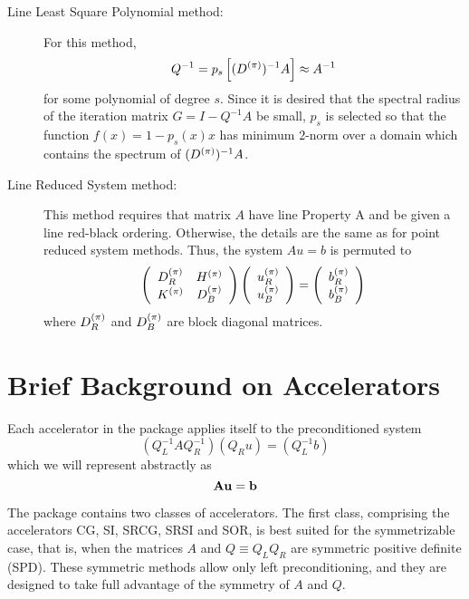 \begin{description}
\item[Line Least Square Polynomial method:]
      For this method,
      \[ Q^{-1} = p_s \left[(D^{(\pi)})^{-1}A \right] \approx A^{-1} \]
      for some polynomial of degree $s$.  Since it is desired that 
      the spectral radius of the iteration matrix $G=I-Q^{-1}A$
      be small, $p_s$ is selected so that the function $f(x)=1-p_s(x)x$
      has minimum $2$-norm over a domain which contains the
      spectrum of $(D^{(\pi)})^{-1}A$.
 
\item[Line Reduced System method:]
      This method requires that matrix $A$ have line Property A
      and be given a line red-black ordering.  Otherwise,
      the details are the same as for point reduced system methods.
      Thus, the system $Au=b$ is permuted to
      \[ \left( \begin{array}{cc}
              D^{(\pi)}_R     & H^{(\pi)} \\
              K^{(\pi)} & D^{(\pi)}_B     \end{array} \right)
         \left( \begin{array}{c}
              u^{(\pi)}_R \\
              u^{(\pi)}_B \end{array} \right) =
         \left( \begin{array}{c}
              b^{(\pi)}_R \\
              b^{(\pi)}_B \end{array} \right) \]
      where $D^{(\pi)}_R$  and $D^{(\pi)}_B$ are block diagonal matrices.
\end{description}
 
\newpage
\section{Brief Background on Accelerators}
\label{bbaccels}
\indent
 
    Each accelerator in the package applies itself to the 
preconditioned system
\[ (Q_L^{-1}AQ_R^{-1})(Q_R u) = (Q_L^{-1}b) \] 
which we will represent abstractly as
\[ {\bf A} {\bf u} = {\bf b} \] 

    The package contains two classes of accelerators.  The first class,
comprising the accelerators CG, SI, SRCG, SRSI and SOR, is best suited 
for the symmetrizable case, that is, when the matrices $A$ and
$Q\equiv Q_LQ_R$ are symmetric positive definite (SPD).  These symmetric 
methods allow only left preconditioning, and they are designed to take 
full advantage of the symmetry of $A$ and $Q$.

